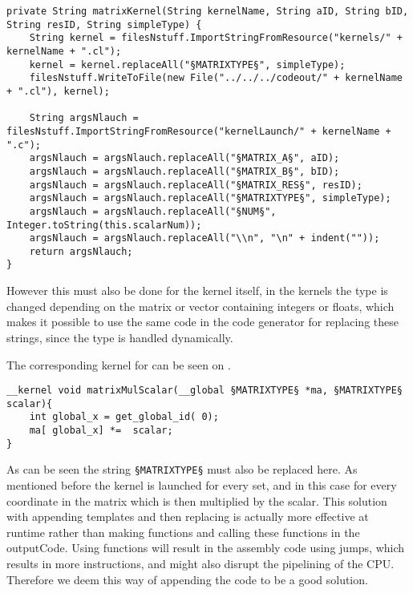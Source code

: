 \begin{lstlisting}[caption=Code for replacing strings with the corresponding information to be appended to the outputCode.,numbers=none,frame=tlrb,label={lst:replaceString}]
private String matrixKernel(String kernelName, String aID, String bID, String resID, String simpleType) {
    String kernel = filesNstuff.ImportStringFromResource("kernels/" + kernelName + ".cl");
    kernel = kernel.replaceAll("§MATRIXTYPE§", simpleType);
    filesNstuff.WriteToFile(new File("../../../codeout/" + kernelName + ".cl"), kernel);

    String argsNlauch = filesNstuff.ImportStringFromResource("kernelLaunch/" + kernelName + ".c");
    argsNlauch = argsNlauch.replaceAll("§MATRIX_A§", aID);
    argsNlauch = argsNlauch.replaceAll("§MATRIX_B§", bID);
    argsNlauch = argsNlauch.replaceAll("§MATRIX_RES§", resID);
    argsNlauch = argsNlauch.replaceAll("§MATRIXTYPE§", simpleType);
    argsNlauch = argsNlauch.replaceAll("§NUM§", Integer.toString(this.scalarNum));
    argsNlauch = argsNlauch.replaceAll("\\n", "\n" + indent(""));
    return argsNlauch;
}
\end{lstlisting}

However this must also be done for the kernel itself, in the kernels the type is changed depending on the matrix or vector containing integers or floats, which makes it possible to use the same code in the code generator for replacing these strings, since the type is handled dynamically.

The corresponding kernel for  can be seen on .
\begin{lstlisting}[caption=Kernel code for multiplying a matrix or vector with a scalar.,numbers=none,frame=tlrb,label={lst:kernel}]
__kernel void matrixMulScalar(__global §MATRIXTYPE§ *ma, §MATRIXTYPE§ scalar){
	int global_x = get_global_id( 0);
	ma[ global_x] *=  scalar;
}
\end{lstlisting}

As can be seen the string \texttt{§MATRIXTYPE§} must also be replaced here.
As mentioned before the kernel is launched for every set, and in this case for every coordinate in the matrix which is then multiplied by the scalar.
This solution with appending templates and then replacing is actually more effective at runtime rather than making functions and calling these functions in the outputCode.
Using functions will result in the assembly code using jumps, which results in more instructions, and might also disrupt the pipelining of the CPU.
Therefore we deem this way of appending the code to be a good solution.
